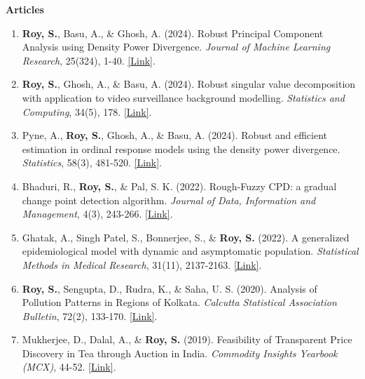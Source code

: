 \documentclass[9pt]{developercv} %
\begin{document}
{
    \small 
    \textbf{Articles}
    \begin{enumerate}
        \item \textbf{Roy, S.}, Basu, A., \& Ghosh, A. (2024). Robust Principal Component Analysis using Density Power Divergence. \emph{Journal of Machine Learning Research}, 25(324), 1-40. \href{https://www.jmlr.org/papers/v25/23-1096.html}{[Link]}.
        \item \textbf{Roy, S.}, Ghosh, A., \& Basu, A. (2024). Robust singular value decomposition with application to video surveillance background modelling. \emph{Statistics and Computing}, 34(5), 178. \href{https://link.springer.com/article/10.1007/s11222-024-10493-7}{[Link]}.
        \item Pyne, A., \textbf{Roy, S.}, Ghosh, A., \& Basu, A. (2024). Robust and efficient estimation in ordinal response models using the density power divergence. \emph{Statistics}, 58(3), 481-520. \href{https://www.tandfonline.com/doi/abs/10.1080/02331888.2024.2347329}{[Link]}.        
        \item Bhaduri, R., \textbf{Roy, S.}, \& Pal, S. K. (2022). Rough-Fuzzy CPD: a gradual change point detection algorithm. \emph{Journal of Data, Information and Management}, 4(3), 243-266. \href{https://link.springer.com/article/10.1007/s42488-022-00077-3}{[Link]}.
        \item Ghatak, A., Singh Patel, S., Bonnerjee, S., \& \textbf{Roy, S.} (2022). A generalized epidemiological model with dynamic and asymptomatic population. \emph{Statistical Methods in Medical Research}, 31(11), 2137-2163. \href{https://journals.sagepub.com/doi/abs/10.1177/09622802221115877}{[Link]}.
        \item \textbf{Roy, S.}, Sengupta, D., Rudra, K., \& Saha, U. S. (2020). Analysis of Pollution Patterns in Regions of Kolkata. \emph{Calcutta Statistical Association Bulletin}, 72(2), 133-170. \href{https://journals.sagepub.com/doi/abs/10.1177/0008068320976781}{[Link]}.
        \item Mukherjee, D., Dalal, A., \& \textbf{Roy, S.} (2019). Feasibility of Transparent Price Discovery in Tea through Auction in India. \emph{Commodity Insights Yearbook (MCX)}, 44-52. \href{https://www.mcxindia.com/docs/default-source/about-us/commodity-insights-yearbook/2019/02-emerging-trends/feasibility-of-transparent-price-discovery-in-tea-through-auction-in-india-dr-diganta-mukherjee-mr-abhinandan-dalal-and-mr-subhrajyoty-roy.pdf}{[Link]}.
    \end{enumerate}

}
\end{document}
